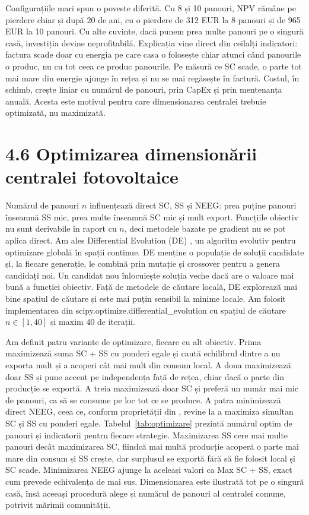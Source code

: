\documentclass[12pt,a4paper]{report}
\begin{document}
Configurațiile mari spun o poveste diferită. Cu 8 și 10 panouri, NPV rămâne pe pierdere chiar și după 20 de ani, cu o pierdere de 312 EUR la 8 panouri și de 965 EUR la 10 panouri. Cu alte cuvinte, dacă punem prea multe panouri pe o singură casă, investiția devine neprofitabilă. Explicația vine direct din ceilalți indicatori: factura scade doar cu energia pe care casa o folosește chiar atunci când panourile o produc, nu cu tot ceea ce produc panourile. Pe măsură ce SC scade, o parte tot mai mare din energie ajunge în rețea și nu se mai regăsește în factură. Costul, în schimb, crește liniar cu numărul de panouri, prin CapEx și prin mentenanța anuală. Acesta este motivul pentru care dimensionarea centralei trebuie optimizată, nu maximizată.

\section*{4.6 Optimizarea dimensionării centralei fotovoltaice}

Numărul de panouri $n$ influențează direct SC, SS și NEEG: prea puține panouri înseamnă SS mic, prea multe înseamnă SC mic și mult export. Funcțiile obiectiv nu sunt derivabile în raport cu $n$, deci metodele bazate pe gradient nu se pot aplica direct. Am ales Differential Evolution (DE) \cite{stornprice1997}, un algoritm evolutiv pentru optimizare globală în spații continue. DE menține o populație de soluții candidate și, la fiecare generație, le combină prin mutație și crossover pentru a genera candidați noi. Un candidat nou înlocuiește soluția veche dacă are o valoare mai bună a funcției obiectiv. Față de metodele de căutare locală, DE explorează mai bine spațiul de căutare și este mai puțin sensibil la minime locale. Am folosit implementarea din scipy.optimize.differential\_evolution cu spațiul de căutare $n \in [1, 40]$ și maxim 40 de iterații.

Am definit patru variante de optimizare, fiecare cu alt obiectiv. Prima maximizează suma SC + SS cu ponderi egale și caută echilibrul dintre a nu exporta mult și a acoperi cât mai mult din consum local. A doua maximizează doar SS și pune accent pe independența față de rețea, chiar dacă o parte din producție se exportă. A treia maximizează doar SC și preferă un număr mai mic de panouri, ca să se consume pe loc tot ce se produce. A patra minimizează direct NEEG, ceea ce, conform proprietății din \cite{simoiu2021jcp}, revine la a maximiza simultan SC și SS cu ponderi egale. Tabelul~\ref{tab:optimizare} prezintă numărul optim de panouri și indicatorii pentru fiecare strategie. Maximizarea SS cere mai multe panouri decât maximizarea SC, fiindcă mai multă producție acoperă o parte mai mare din consum și SS crește, dar surplusul se exportă fără să fie folosit local și SC scade. Minimizarea NEEG ajunge la aceleași valori ca Max SC + SS, exact cum prevede echivalența de mai sus. Dimensionarea este ilustrată tot pe o singură casă, însă aceeași procedură alege și numărul de panouri al centralei comune, potrivit mărimii comunității.
\end{document}
